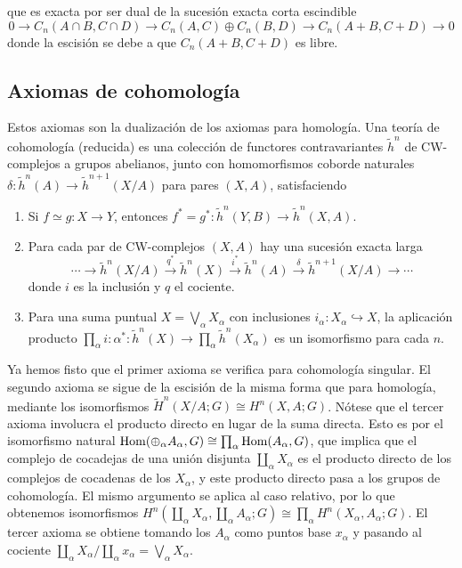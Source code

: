 \documentclass[TA.tex]{subfiles}
\begin{document}
que es exacta por ser dual de la sucesión exacta corta escindible
\[
0\to C_n(A\cap B, C\cap D)\to C_n(A,C)\oplus C_n(B,D)\to C_n(A+B,C+D)\to 0
\]
donde la escisión se debe a que $C_n(A+B,C+D)$ es libre. 

\subsection{Axiomas de cohomología}
Estos axiomas son la dualización de los axiomas para homología. Una teoría de cohomología (reducida) es una colección de functores contravariantes $\widetilde{h}^n$ de CW-complejos a grupos abelianos, junto con homomorfismos coborde naturales $\delta:\widetilde{h}^n(A)\to\widetilde{h}^{n+1}(X/A)$ para pares $(X,A)$, satisfaciendo
\begin{enumerate}
\item Si $f\simeq g:X\to Y$, entonces $f^*=g^*:\widetilde{h}^n(Y,B)\to\widetilde{h}^n(X,A)$.
\item Para cada par de CW-complejos $(X,A)$ hay una sucesión exacta larga
\[
\cdots\to\widetilde{h}^n(X/A)\xrightarrow{q^*}\widetilde{h}^n(X)\xrightarrow{i^*}\widetilde{h}^n(A)\xrightarrow{\delta}\widetilde{h}^{n+1}(X/A)\to\cdots
\]
donde $i$ es la inclusión y $q$ el cociente.
\item Para una suma puntual $X=\bigvee_\alpha X_\alpha$ con inclusiones $i_\alpha:X_\alpha\hookrightarrow X$, la aplicación producto $\prod_\alpha i:\alpha^*:\widetilde{h}^n(X)\to\prod_\alpha\widetilde{h}^n(X_\alpha)$ es un isomorfismo para cada $n$.
\end{enumerate}
Ya hemos fisto que el primer axioma se verifica para cohomología singular. El segundo axioma se sigue de la escisión de la misma forma que para homología, mediante los isomorfismos $\widetilde{H}^n(X/A;G)\cong H^n(X,A;G)$. Nótese que el tercer axioma involucra el producto directo en lugar de la suma directa. Esto es por el isomorfismo natural $\operatorname{Hom}(\oplus_\alpha A_\alpha,G)\cong\prod_\alpha\operatorname{Hom}(A_\alpha,G)$, que implica que el complejo de cocadejas de una unión disjunta $\coprod_\alpha X_\alpha$ es el producto directo de los complejos de cocadenas de los $X_\alpha$, y este producto directo pasa a los grupos de cohomología. El mismo argumento se aplica al caso relativo, por lo que obtenemos isomorfismos $H^n(\coprod_\alpha X_\alpha,\coprod_\alpha A_\alpha;G)\cong\prod_\alpha H^n(X_\alpha,A_\alpha;G)$. El tercer axioma se obtiene tomando los $A_\alpha$ como puntos base $x_\alpha$ y pasando al cociente $\coprod_\alpha X_\alpha/\coprod_\alpha x_\alpha=\bigvee_\alpha X_\alpha$. 
\end{document}
